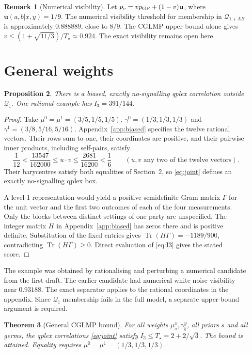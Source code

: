 \documentclass[11pt]{article}
\newtheorem{theorem}{Theorem}
\newtheorem{proposition}[theorem]{Proposition}
\theoremstyle{definition}
\newtheorem{remark}[theorem]{Remark}
\newcommand{\Tq}{T_{\star}}
\newcommand{\tr}{\operatorname{Tr}}
\newcommand{\qone}{\mathcal{Q}_1}
\newcommand{\qab}{\mathcal{Q}_{1+AB}}
\begin{document}
\begin{remark}[Numerical visibility]
Let $p_v=v p_{\rm GP}+(1-v)\mathbf{u}$, where $\mathbf{u}(a,b|x,y)=1/9$.
The numerical visibility threshold for membership in $\qab$ is approximately $0.888889$,
close to $8/9$. The CGLMP upper bound alone gives $v\le(1+\sqrt{11/3})/\Tq\approx0.924$.
The exact visibility remains open here.
\end{remark}

\section{General weights}\label{sec:general}

\begin{proposition}\label{prop:biasedQ1}
There is a biased, exactly no-signalling qplex correlation outside $\qone$.
One rational example has $I_3=391/144$.
\end{proposition}
\begin{proof}
Take $\mu^0=\mu^1=(3/5,1/5,1/5)$, $\gamma^0=(1/3,1/3,1/3)$ and
$\gamma^1=(3/8,5/16,5/16)$. Appendix~\ref{app:biased} specifies the twelve rational
vectors. Their rows sum to one, their coordinates are positive, and their pairwise inner
products, including self-pairs, satisfy
\[
 \frac1{12}<\frac{13547}{162000}\le u\cdot v\le\frac{2681}{16200}<\frac16
 \qquad (u,v\text{ any two of the twelve vectors}).
\]
Their barycentres satisfy both equalities of Section~2, so \eqref{eq:joint} defines an
exactly no-signalling qplex box.

A level-1 representation would yield a positive semidefinite Gram matrix $\Gamma$
for the unit vector and the first two outcomes of each of the four measurements.
Only the blocks between distinct settings of one party are unspecified.
The integer matrix $H$ in Appendix~\ref{app:biased} has zeros there and is positive definite.
Substitution of the fixed entries gives $\tr(H\Gamma)=-1189/900$, contradicting
$\tr(H\Gamma)\ge0$. Direct evaluation of \eqref{eq:I3} gives the stated score.
\end{proof}
The example was obtained by rationalising and perturbing a numerical candidate from the
first draft. The earlier candidate had numerical white-noise visibility near $0.93188$. The exact separator applies to the rational coordinates in the appendix.
Since $\qone$ membership fails in the full model, a separate upper-bound argument is required.

\begin{theorem}[General CGLMP bound]\label{thm:main}
For all weights $\mu^x_a,\gamma^y_b$, all priors $s$ and all germs, the qplex correlations \eqref{eq:joint} satisfy
$I_3\le\Tq=2+2/\sqrt3$. The bound is attained. Equality requires $\mu^0=\mu^1=(1/3,1/3,1/3)$.
\end{theorem}
\end{document}
